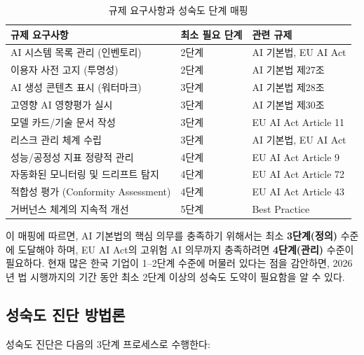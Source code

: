 \begin{table}[htbp]
\centering
\caption{규제 요구사항과 성숙도 단계 매핑}
\label{tab:regulation_maturity_mapping}
\begin{tabularx}{\textwidth}{|X|l|l|}
\hline
\textbf{규제 요구사항} & \textbf{최소 필요 단계} & \textbf{관련 규제} \\ \hline
AI 시스템 목록 관리 (인벤토리) & 2단계 & AI 기본법, EU AI Act \\ \hline
이용자 사전 고지 (투명성) & 2단계 & AI 기본법 제27조 \\ \hline
AI 생성 콘텐츠 표시 (워터마크) & 3단계 & AI 기본법 제28조 \\ \hline
고영향 AI 영향평가 실시 & 3단계 & AI 기본법 제30조 \\ \hline
모델 카드/기술 문서 작성 & 3단계 & EU AI Act Article 11 \\ \hline
리스크 관리 체계 수립 & 3단계 & AI 기본법, EU AI Act \\ \hline
성능/공정성 지표 정량적 관리 & 4단계 & EU AI Act Article 9 \\ \hline
자동화된 모니터링 및 드리프트 탐지 & 4단계 & EU AI Act Article 72 \\ \hline
적합성 평가 (Conformity Assessment) & 4단계 & EU AI Act Article 43 \\ \hline
거버넌스 체계의 지속적 개선 & 5단계 & Best Practice \\ \hline
\end{tabularx}
\end{table}

이 매핑에 따르면, AI 기본법의 핵심 의무를 충족하기 위해서는 최소 \textbf{3단계(정의)} 수준에 도달해야 하며, EU AI Act의 고위험 AI 의무까지 충족하려면 \textbf{4단계(관리)} 수준이 필요하다. 현재 많은 한국 기업이 1--2단계 수준에 머물러 있다는 점을 감안하면, 2026년 법 시행까지의 기간 동안 최소 2단계 이상의 성숙도 도약이 필요함을 알 수 있다.

\subsection{성숙도 진단 방법론}
성숙도 진단은 다음의 3단계 프로세스로 수행한다:

